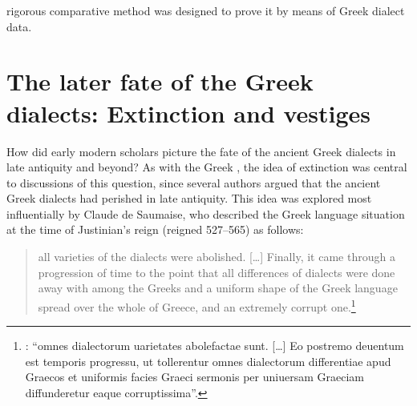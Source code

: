 rigorous comparative method was designed to prove it by means of Greek dialect data.

\section{The later fate of the Greek dialects: Extinction and vestiges}\label{sec:5.5}

How did early modern scholars picture the fate of the ancient Greek dialects in late antiquity and beyond? As with the Greek , the idea of extinction was central to discussions of this question, since several authors argued that the ancient Greek dialects had perished in late antiquity. This idea was explored most influentially by Claude de Saumaise, who described the Greek language situation at the time of Justinian’s reign (reigned 527–565) as follows:

\begin{quote}
all varieties of the dialects were abolished. […] Finally, it came through a progression of time to the point that all differences of dialects were done away with among the Greeks and a uniform shape of the Greek language spread over the whole of Greece, and an extremely corrupt one.\footnote{\citet[446--447]{Saumaise1643a}: “omnes dialectorum uarietates abolefactae sunt. […] Eo postremo deuentum est temporis progressu, ut tollerentur omnes dialectorum differentiae apud Graecos et uniformis facies Graeci sermonis per uniuersam Graeciam diffunderetur eaque corruptissima”.}
\end{quote}

